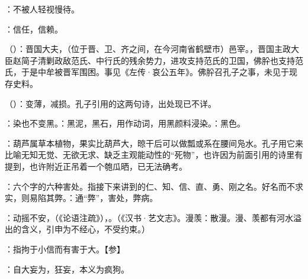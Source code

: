 {
\item {}：不被人轻视慢待。
\item {}：信任，信赖。
}
{}


{
\item {}（）：晋国大夫，（位于晋、卫、齐之间，在今河南省鹤壁市）邑宰。，晋国主政大臣赵简子清剿政敌范氏、中行氏的残余势力，进攻支持范氏的卫国，佛肸也支持范氏，于是中牟被晋军围困。事见《左传·哀公五年》。佛肸召孔子之事，未见于现存史料。%
\item {}（）：变薄，减损。孔子引用的这两句诗，出处现已不详。

：染也不变黑。：黑泥，黑石，用作动词，用黑颜料浸染。：黑色。

\item {}：葫芦属草本植物，果实比葫芦大，晾干后可以做瓢或系在腰间凫水。孔子用它来比喻无知无觉、无欲无求、缺乏主观能动性的“死物”，也许因为前面引用的诗里有提到，也许附近正吊着一个匏瓜晒，已无法确考。
}
{}


{
\item {}：六个字的六种害处。指接下来讲到的仁、知、信、直、勇、刚之名。好名而不求实，则易陷其弊。：通“弊”，害处，弊病。
\item {}：动摇不安，（《论语注疏》），。（《汉书·艺文志》。漫羡：散漫。漫、羡都有河水溢出的含义，引申为不经心，不受约束。）
\item {}：指拘于小信而有害于大。【参】 
\item {}：自大妄为，狂妄，本义为疯狗。
}
{}  %


